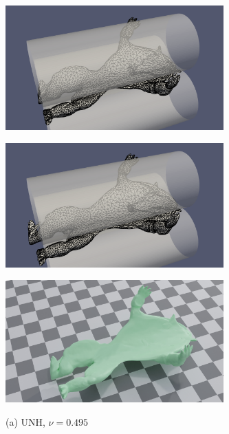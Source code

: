 \begin{figure}
	\centering
	\begin{subfigure}{.49\linewidth}
		\centering
		{\includegraphics[width=3.3in]{images/armadillo/pr0495_mesh.png}}
		\label{sfig:armadillo_pr_0495}
	\end{subfigure}%
	\begin{subfigure}{.49\linewidth}
		\centering
		{\includegraphics[width=3.3in]{images/armadillo/vc_mesh.png}}
		\label{sfig:armadillo_pr_0495}
	\end{subfigure} \par \medskip
	\begin{subfigure}{.49\linewidth}
		\centering
		{\includegraphics[width=3.3in]{images/armadillo/pr0495.jpg}}
		\caption*{(a) UNH, $\nu = 0.495$}
		\label{sfig:armadillo_pr_0495}
	\end{subfigure}%
	\begin{subfigure}{.49\linewidth}

\end{subfigure}
\end{figure}
